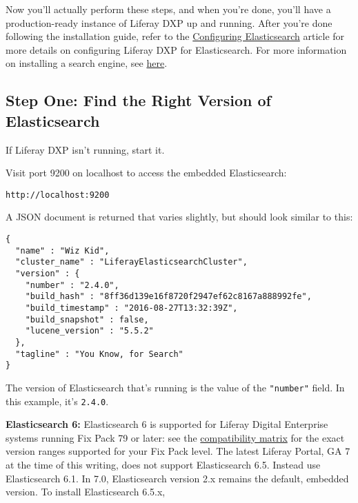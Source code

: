 Now you'll actually perform these steps, and when you're done, you'll
have a production-ready instance of Liferay DXP up and running. After
you're done following the installation guide, refer to the
\href{/docs/7-0/deploy/-/knowledge_base/d/configuring-elasticsearch-for-liferay-0}{Configuring
Elasticsearch} article for more details on configuring Liferay DXP for
Elasticsearch. For more information on installing a search engine, see
\href{/docs/7-0/deploy/-/knowledge_base/d/installing-a-search-engine}{here}.

\subsection{Step One: Find the Right Version of
Elasticsearch}\label{step-one-find-the-right-version-of-elasticsearch}

If Liferay DXP isn't running, start it.

Visit port 9200 on localhost to access the embedded Elasticsearch:

\begin{verbatim}
http://localhost:9200
\end{verbatim}

A JSON document is returned that varies slightly, but should look
similar to this:

\begin{verbatim}
{
  "name" : "Wiz Kid",
  "cluster_name" : "LiferayElasticsearchCluster",
  "version" : {
    "number" : "2.4.0",
    "build_hash" : "8ff36d139e16f8720f2947ef62c8167a888992fe",
    "build_timestamp" : "2016-08-27T13:32:39Z",
    "build_snapshot" : false,
    "lucene_version" : "5.5.2"
  },
  "tagline" : "You Know, for Search"
}
\end{verbatim}

The version of Elasticsearch that's running is the value of the
\texttt{"number"} field. In this example, it's \texttt{2.4.0}.

\noindent\hrulefill

\textbf{Elasticsearch 6:} Elasticsearch 6 is supported for Liferay
Digital Enterprise systems running Fix Pack 79 or later: see the
\href{https://www.liferay.com/documents/10182/246659966/Liferay+DXP+7.0+Compatibility+Matrix.pdf}{compatibility
matrix} for the exact version ranges supported for your Fix Pack level.
The latest Liferay Portal, GA 7 at the time of this writing, does not
support Elasticsearch 6.5. Instead use Elasticsearch 6.1. In 7.0,
Elasticsearch version 2.x remains the default, embedded version. To
install Elasticsearch 6.5.x,

